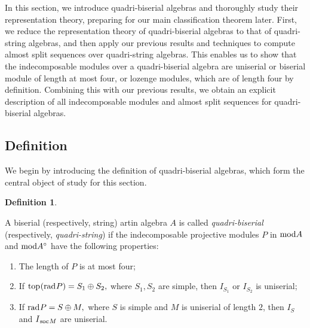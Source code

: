 \documentclass[10pt]{amsart}
\theoremstyle{definition}
\newtheorem{Defn}[Theo]{Definition}
\newcommand{\mmod}{{\rm mod}}
\newcommand{\rad}{{\rm rad}\hspace{.5pt}}
\newcommand{\soc}{{\rm soc}\hspace{.5pt}}
\newcommand{\ntop}{{\rm top}\hspace{.5pt}}
\newcommand{\vp}{\vspace{.5pt}}
\begin{document}
In this section, we introduce quadri-biserial algebras and thoroughly study their representation theory, preparing for our main classification theorem later. First, we reduce the representation theory of quadri-biserial algebras to that of quadri-string algebras, and then apply our previous results and techniques to compute almost split sequences over quadri-string algebras. This enables us to show that the indecomposable modules over a quadri-biserial algebra are uniserial or biserial module of length at most four, or lozenge modules, which are of length four by definition. Combining this with our previous results, we obtain an explicit description of all indecomposable modules and almost split sequences for quadri-biserial algebras.

\subsection{\sc Definition} We begin by introducing the definition of quadri-biserial algebras, which form the central object of study for this section. 

\begin{Defn}\label{4str_alg_def}

A biserial (respectively, string) artin algebra $A$ is called  {\it quadri-biserial} (respectively, {\it quadri-string}) \vp if the indecomposable projective modules $P$ in $\mmod A$ and $\mmod A^\circ$ have the following properties:

\begin{enumerate}[$(1)$]

\vspace{-1pt}

\item The length of $P$ is at most four;

\vp
    
\item If $\ntop(\rad P)=S_1\oplus S_2,$ where $S_1, S_2$ are simple, then $I_{S_1}$ or $I_{S_2}$ is uniserial;

\vp

\item If $\rad P=S\oplus M,$ \vspace{-1pt} where $S$ is simple and $M$ is uniserial of length $2$, then $I_S$ and $I_{\hspace{.8pt}\soc M}$ are uniserial.

\end{enumerate} \end{Defn}
\end{document}

